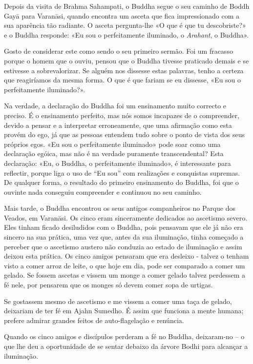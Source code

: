 Depois da visita de Brahma Sahampati, o Buddha segue o seu caminho de Boddh Gayā
para Varanāsi, quando encontra um asceta que fica impressionado com a sua
aparência tão radiante. O asceta pergunta-lhe «O que é que tu descobriste?» e o
Buddha responde: «Eu sou o perfeitamente iluminado, o \emph{Arahant}, o Buddha».

Gosto de considerar este como sendo o seu primeiro sermão. Foi um fracasso
porque o homem que o ouviu, pensou que o Buddha tivesse praticado demais e se
estivesse a sobrevalorizar. Se alguém nos dissesse estas palavras, tenho a
certeza que reagiríamos da mesma forma. O que é que fariam se eu dissesse, «Eu
sou o perfeitamente iluminado?».

Na verdade, a declaração do Buddha foi um ensinamento muito correcto e preciso.
É o ensinamento perfeito, mas nós somos incapazes de o compreender, devido a
pensar e a interpretar erroneamente, que uma afirmação como esta provém do ego,
já que as pessoas entendem tudo sobre o ponto de vista dos seus próprios egos.
«Eu sou o perfeitamente iluminado» pode soar como uma declaração egóica, mas não
é na verdade puramente transcendental? Esta declaração: «Eu, o Buddha, o
perfeitamente iluminado», é interessante para reflectir, porque liga o uso de
“Eu sou” com realizações e conquistas supremas. De qualquer forma, o resultado
do primeiro ensinamento do Buddha, foi que o ouvinte nada conseguiu compreender
e continuou no seu caminho.

Mais tarde, o Buddha encontrou os seus antigos companheiros no Parque dos
Veados, em Varanāsi. Os cinco eram sinceramente dedicados ao ascetismo severo.
Eles tinham ficado desiludidos com o Buddha, pois pensavam que ele já não era
sincero na sua prática, uma vez que, antes da sua iluminação, tinha começado a
perceber que o ascetismo austero não conduzia ao estado de iluminação e assim
deixou esta prática. Os cinco amigos pensaram que era desleixo - talvez o tenham
visto a comer arroz de leite, o que hoje em dia, pode ser comparado a comer um
gelado. Se fossem ascetas e vissem um monge a comer gelado talvez perdessem a fé
nele, por pensarem que os monges só devem comer sopa de urtigas.

Se gostassem mesmo de ascetismo e me vissem a comer uma taça de gelado,
deixariam de ter fé em Ajahn Sumedho. É assim que funciona a mente humana;
prefere admirar grandes feitos de auto-flagelação e renúncia.

Quando os cinco amigos e discípulos perderam a fé no Buddha, deixaram-no – o que
lhe deu a oportunidade de se sentar debaixo da árvore Bodhi para alcançar a
iluminação.

